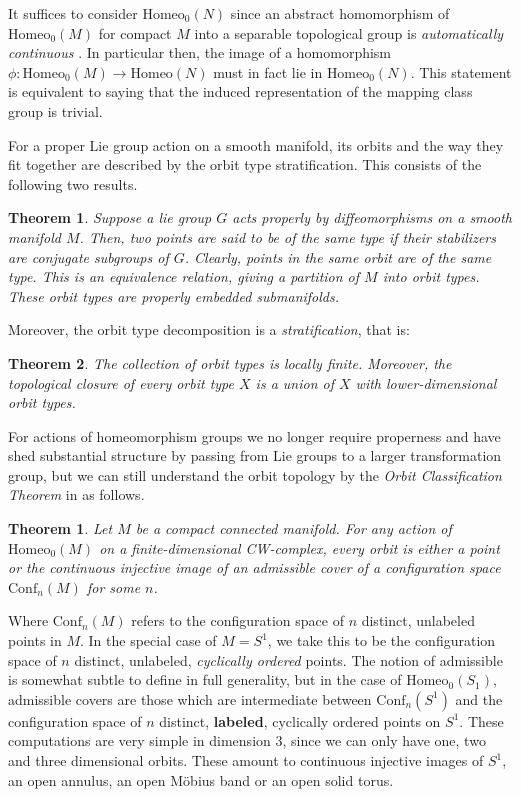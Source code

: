 \documentclass[10pt, oneside]{article}
\newtheorem{thm}{Theorem}
\newtheorem*{thm*}{Theorem}
\theoremstyle{definition}
\theoremstyle{definition}
\begin{document}
It suffices to consider $\text{Homeo}_0(N)$ since an abstract homomorphism of $\text{Homeo}_0(M)$ for compact $M$ into a separable topological group is {\it automatically continuous} \cite{mann-auto-continuity}. In particular then, the image of a homomorphism $\phi: \text{Homeo}_0(M) \to \text{Homeo}(N)$ must in fact lie in $\text{Homeo}_0(N)$. This statement is equivalent to saying that the induced representation of the mapping class group is trivial.

For a proper Lie group action on a smooth manifold, its orbits and the way they fit together are described by the orbit type stratification. This consists of the following two results\cite{top-trans-groups}.
\begin{thm*}
    Suppose a lie group $G$ acts properly by diffeomorphisms on a smooth manifold $M$. Then, two points are said to be of the same {\it type} if their stabilizers are conjugate subgroups of $G$. Clearly, points in the same orbit are of the same type. This is an equivalence relation, giving a partition of $M$ into {\it orbit types}. These orbit types are properly embedded submanifolds.
\end{thm*}

Moreover, the orbit type decomposition is a {\it stratification}, that is:

\begin{thm*}
    The collection of orbit types is locally finite. Moreover, the topological closure of every orbit type $X$ is a union of $X$ with lower-dimensional orbit types.
\end{thm*}

For actions of homeomorphism groups we no longer require properness and have shed substantial structure by passing from Lie groups to a larger transformation group, but we can still understand the orbit topology by the {\it Orbit Classification Theorem} in \cite{mann-chen} as follows.

\begin{thm}
    Let $M$ be a compact connected manifold. For any action of $\mathrm{Homeo}_0(M)$ on a finite-dimensional CW-complex, every orbit is either a point or the continuous injective image of an {\it admissible} cover of a configuration space $\mathrm{Conf}_n(M)$ for some $n$.
\end{thm}

Where $\text{Conf}_n(M)$ refers to the configuration space of $n$ distinct, unlabeled points in $M$. In the special case of $M= S^1$, we take this to be the configuration space of $n$ distinct, unlabeled, {\it cyclically ordered} points. The notion of admissible is somewhat subtle to define in full generality, but in the case of $\text{Homeo}_0(S_1)$, admissible covers are those which are intermediate between $\text{Conf}_n(S^1)$ and the configuration space of $n$ distinct, {\bf labeled}, cyclically ordered points on $S^1$. These computations are very simple in dimension 3, since we can only have one, two and three dimensional orbits. These amount to continuous injective images of $S^1$, an open annulus, an open M\"{o}bius band or an open solid torus.
\end{document}
